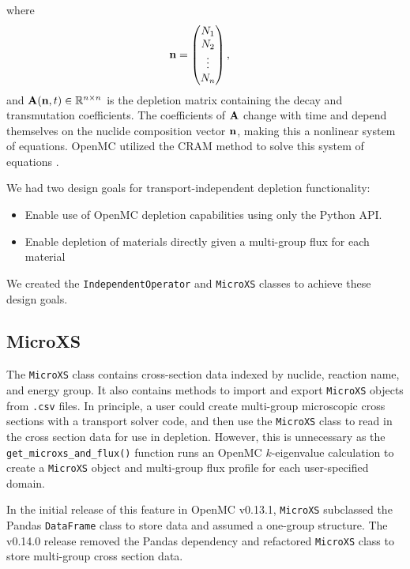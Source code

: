     where
    \begin{equation}
      \mathbf{n} = \begin{pmatrix} N_1 \\ N_2 \\ \vdots \\ N_n \end{pmatrix}, \quad
    \end{equation}
    and $\mathbf{A}(\mathbf{n},t) \in \mathbb{R}^{n\times n}$ is the depletion
    matrix containing the decay and transmutation coefficients. The coefficients
    of $\mathbf{A}$ change with time and depend themselves on the nuclide
    composition vector $\mathbf{n}$, making this a nonlinear system of equations.
    OpenMC utilized the \Gls{CRAM} method to solve this system of equations
    \cite{romano_depletion_2021}. 
    
    We had two design goals for
    transport-independent depletion functionality:
    \begin{itemize}
        \item Enable use of OpenMC depletion capabilities using only the Python API.
        \item Enable depletion of materials directly given a multi-group flux
            for each material 
    \end{itemize}
    
    We created the \verb.IndependentOperator. and \verb.MicroXS. classes to
    achieve these design goals.    
    \subsection{MicroXS}
        \label{sub:microxs}
        The \verb.MicroXS. class contains cross-section data indexed by nuclide,
        reaction name, and energy group. It also contains methods to import and
        export \verb.MicroXS. objects from \verb,.csv, files. In principle, a
        user could create multi-group microscopic cross sections with a
        transport solver code, and then use the \verb.MicroXS.  class to read in
        the cross section data for use in depletion. However, this is
        unnecessary as the \verb.get_microxs_and_flux(). function runs an OpenMC
        $k$-eigenvalue calculation to create a \verb.MicroXS. object and
        multi-group flux profile for each user-specified domain.

        In the initial release of this feature in OpenMC v0.13.1, \verb.MicroXS.
        subclassed the Pandas \verb.DataFrame. class to store data and assumed a
        one-group structure. The v0.14.0 release removed the Pandas dependency
        and refactored \verb.MicroXS. class to store multi-group cross section
        data.

